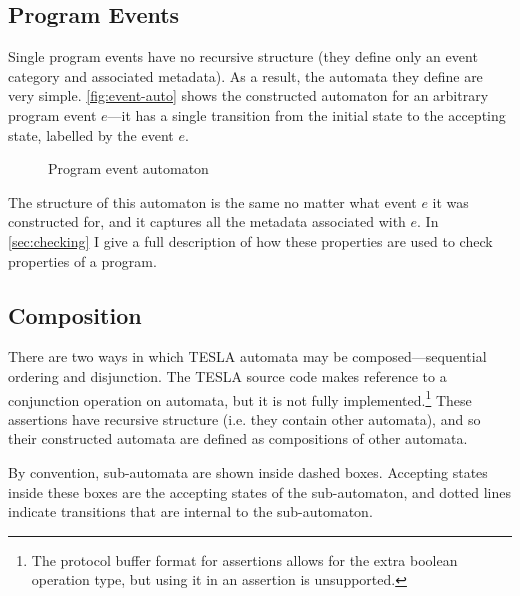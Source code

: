 \subsection{Program Events}

Single program events have no recursive structure (they define only an event
category and associated metadata). As a result, the automata they define are
very simple. \autoref{fig:event-auto} shows the constructed automaton for an
arbitrary program event $e$---it has a single transition from the initial state
to the accepting state, labelled by the event $e$.

\begin{figure}
  \centering
  \caption{Program event automaton}
  \label{fig:event-auto}
\end{figure}

The structure of this automaton is the same no matter what event $e$ it was
constructed for, and it captures all the metadata associated with $e$. In
\autoref{sec:checking} I give a full description of how these properties are
used to check properties of a program.

\subsection{Composition}

There are two ways in which TESLA automata may be composed---sequential
ordering and disjunction. The TESLA source code makes reference to a
conjunction operation on automata, but it is not fully
implemented.\footnote{The protocol buffer format for assertions allows
for the extra boolean operation type, but using it in an assertion is
unsupported.} These assertions have recursive structure (i.e.  they
contain other automata), and so their constructed automata are defined
as compositions of other automata.

By convention, sub-automata are shown inside dashed boxes. Accepting states
inside these boxes are the accepting states of the sub-automaton, and dotted
lines indicate transitions that are internal to the sub-automaton.

